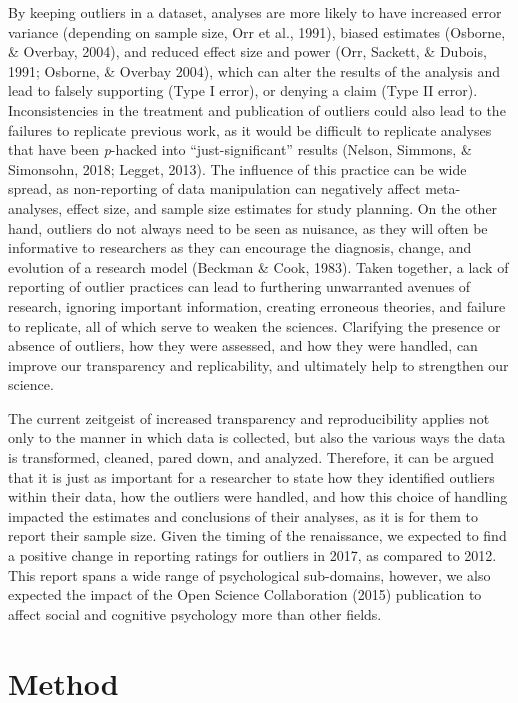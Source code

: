 \documentclass[english,man]{apa6}
\theoremstyle{definition}
\theoremstyle{definition}
\theoremstyle{definition}
\theoremstyle{remark}
\begin{document}
By keeping outliers in a dataset, analyses are more likely to have
increased error variance (depending on sample size, Orr et al., 1991),
biased estimates (Osborne, \& Overbay, 2004), and reduced effect size
and power (Orr, Sackett, \& Dubois, 1991; Osborne, \& Overbay 2004),
which can alter the results of the analysis and lead to falsely
supporting (Type I error), or denying a claim (Type II error).
Inconsistencies in the treatment and publication of outliers could also
lead to the failures to replicate previous work, as it would be
difficult to replicate analyses that have been \emph{p}-hacked into
\enquote{just-significant} results (Nelson, Simmons, \& Simonsohn, 2018;
Legget, 2013). The influence of this practice can be wide spread, as
non-reporting of data manipulation can negatively affect meta-analyses,
effect size, and sample size estimates for study planning. On the other
hand, outliers do not always need to be seen as nuisance, as they will
often be informative to researchers as they can encourage the diagnosis,
change, and evolution of a research model (Beckman \& Cook, 1983). Taken
together, a lack of reporting of outlier practices can lead to
furthering unwarranted avenues of research, ignoring important
information, creating erroneous theories, and failure to replicate, all
of which serve to weaken the sciences. Clarifying the presence or
absence of outliers, how they were assessed, and how they were handled,
can improve our transparency and replicability, and ultimately help to
strengthen our science.

The current zeitgeist of increased transparency and reproducibility
applies not only to the manner in which data is collected, but also the
various ways the data is transformed, cleaned, pared down, and analyzed.
Therefore, it can be argued that it is just as important for a
researcher to state how they identified outliers within their data, how
the outliers were handled, and how this choice of handling impacted the
estimates and conclusions of their analyses, as it is for them to report
their sample size. Given the timing of the renaissance, we expected to
find a positive change in reporting ratings for outliers in 2017, as
compared to 2012. This report spans a wide range of psychological
sub-domains, however, we also expected the impact of the Open Science
Collaboration (2015) publication to affect social and cognitive
psychology more than other fields.

\section{Method}\label{method}
\end{document}
